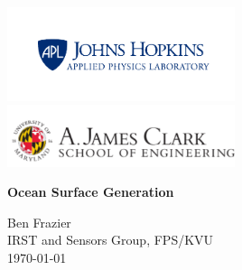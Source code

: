 \documentclass[12pt]{../packages/thesis}  %
\numberwithin{equation}{chapter}
\begin{document}
\titlepage
\begin{center}
\vspace*{25pt}
\includegraphics[width=0.5\textwidth]{../media/apl_small_horizontal_blue}~\\[1cm]
\includegraphics[width=0.5\textwidth]{../media/clark}~\\[1cm]

\vspace{50pt}

{\huge \bfseries Ocean Surface Generation\\[0.4 cm]}


\vspace{25pt}
\large Ben Frazier \\
\large IRST and Sensors Group, FPS/KVU \\
\vspace{125pt}
\large \today
\end{center}




\setcounter{page}{1}



\newpage
 

\end{document}
